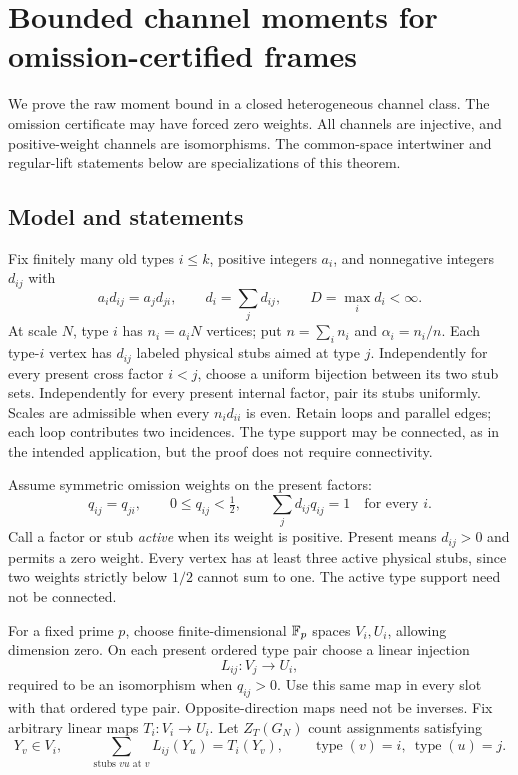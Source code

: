 \section{Bounded channel moments for omission-certified frames}
\label{ch:sec:channel-proof}\label{sec:frame-moment-proof}
We prove the raw moment bound in a closed heterogeneous channel class.
The omission certificate may have forced zero weights. All channels
are injective, and positive-weight channels are isomorphisms.
The common-space intertwiner and regular-lift statements below are
specializations of this theorem.

\subsection{Model and statements}
Fix finitely many old types $i\le k$, positive integers $a_i$, and nonnegative integers $d_{ij}$ with
\[
 a_id_{ij}=a_jd_{ji},\qquad d_i=\sum_jd_{ij},\qquad D=\max_i d_i<\infty.
\]
At scale $N$, type $i$ has $n_i=a_iN$ vertices; put $n=\sum_i n_i$ and $\alpha_i=n_i/n$. Each type-$i$ vertex has $d_{ij}$ labeled physical stubs aimed at type $j$. Independently for every present cross factor $i<j$, choose a uniform bijection between its two stub sets. Independently for every present internal factor, pair its stubs uniformly. Scales are admissible when every $n_id_{ii}$ is even. Retain loops and parallel edges; each loop contributes two incidences. The type support may be connected, as in the intended application, but the proof does not require connectivity.

Assume symmetric omission weights on the present factors:
\begin{equation}\label{ch:eq:q}
 q_{ij}=q_{ji},\qquad 0\le q_{ij}<\tfrac12,\qquad
 \sum_j d_{ij}q_{ij}=1\quad\text{for every }i.
\end{equation}
Call a factor or stub \emph{active} when its weight is positive. Present means $d_{ij}>0$ and permits a zero weight. Every vertex has at least three active physical stubs, since two weights strictly below $1/2$ cannot sum to one. The active type support need not be connected.

For a fixed prime $p$, choose finite-dimensional $\mathbb F_p$ spaces $V_i,U_i$, allowing dimension zero. On each present ordered type pair choose a linear injection
\[
 L_{ij}:V_j\longrightarrow U_i,
\]
required to be an isomorphism when $q_{ij}>0$. Use this same map in every slot with that ordered type pair. Opposite-direction maps need not be inverses. Fix arbitrary linear maps $T_i:V_i\to U_i$. Let $Z_T(G_N)$ count assignments satisfying
\begin{equation}\label{ch:eq:system}
 Y_v\in V_i,\qquad
 \sum_{\text{stubs }vu\text{ at }v}L_{ij}(Y_u)=T_i(Y_v),
 \qquad \operatorname{type}(v)=i,\ \operatorname{type}(u)=j.
\end{equation}

